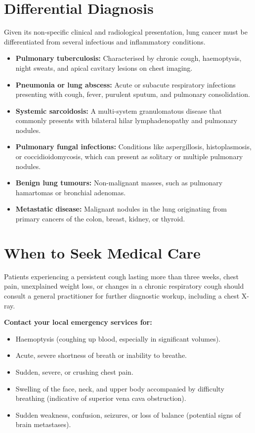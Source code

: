 \section*{Differential Diagnosis}
Given its non-specific clinical and radiological presentation, lung cancer must be differentiated from several infectious and inflammatory conditions.
\begin{itemize}
    \item \textbf{Pulmonary tuberculosis:} Characterised by chronic cough, haemoptysis, night sweats, and apical cavitary lesions on chest imaging.
    \item \textbf{Pneumonia or lung abscess:} Acute or subacute respiratory infections presenting with cough, fever, purulent sputum, and pulmonary consolidation.
    \item \textbf{Systemic sarcoidosis:} A multi-system granulomatous disease that commonly presents with bilateral hilar lymphadenopathy and pulmonary nodules.
    \item \textbf{Pulmonary fungal infections:} Conditions like aspergillosis, histoplasmosis, or coccidioidomycosis, which can present as solitary or multiple pulmonary nodules.
    \item \textbf{Benign lung tumours:} Non-malignant masses, such as pulmonary hamartomas or bronchial adenomas.
    \item \textbf{Metastatic disease:} Malignant nodules in the lung originating from primary cancers of the colon, breast, kidney, or thyroid.
\end{itemize}

\section*{When to Seek Medical Care}
Patients experiencing a persistent cough lasting more than three weeks, chest pain, unexplained weight loss, or changes in a chronic respiratory cough should consult a general practitioner for further diagnostic workup, including a chest X-ray.

\textbf{Contact your local emergency services for:}
\begin{itemize}
    \item Haemoptysis (coughing up blood, especially in significant volumes).
    \item Acute, severe shortness of breath or inability to breathe.
    \item Sudden, severe, or crushing chest pain.
    \item Swelling of the face, neck, and upper body accompanied by difficulty breathing (indicative of superior vena cava obstruction).
    \item Sudden weakness, confusion, seizures, or loss of balance (potential signs of brain metastases).
\end{itemize}

